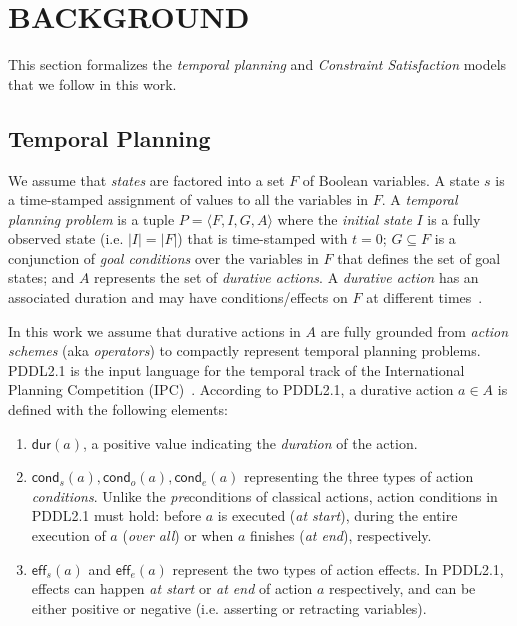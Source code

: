 \documentclass{ecai}
\newcommand{\tup}[1]{{\langle #1 \rangle}}
\newcommand{\eff}{\mathsf{eff}}    %
\newcommand{\cond}{\mathsf{cond}}  %
\newcommand{\dur}{\mathsf{dur}}    %
\begin{document}
\section{BACKGROUND}

This section formalizes the {\em temporal planning} and {\em Constraint Satisfaction} models that we follow in this work.

\subsection{Temporal Planning}
\label{sec:temporalplanning}

We assume that {\em states} are factored into a set $F$ of Boolean variables. A state $s$ is a time-stamped assignment of values to all the variables in $F$. A {\em temporal planning problem} is a tuple $P=\tup{F,I,G,A}$ where the {\em initial state} $I$ is a fully observed state (i.e. $|I|=|F|$) that is time-stamped with $t=0$; $G \subseteq F$ is a conjunction of {\em goal conditions} over the variables in $F$ that defines the set of goal states; and $A$ represents the set of {\em durative actions}. A {\em durative action} has an associated duration and may have conditions/effects on $F$ at different times~\cite{garrido2009constraint,vidal2006branching}.


In this work we assume that durative actions in $A$ are fully grounded from {\em action schemes} (aka {\em operators}) to compactly represent temporal planning problems.  PDDL2.1 is the input language for the temporal track of the International Planning Competition (IPC)~\cite{fox2003pddl2,ghallab2004automated}. According to PDDL2.1, a durative action $a\in A$ is defined with the following elements:

\begin{enumerate}
\item $\dur(a)$, a positive value indicating the {\em duration} of the action.

\item $\cond_s(a), \cond_o(a), \cond_e(a)$ representing the three types of action {\em conditions}. Unlike the \emph{pre}conditions of classical actions, action conditions in PDDL2.1 must hold: before $a$ is executed ({\em at start}), during the entire execution of $a$ ({\em over all}) or when $a$ finishes ({\em at end}), respectively. 

\item $\eff_s(a)$ and $\eff_e(a)$ represent the two types of action effects. In PDDL2.1, effects can happen {\em at start} or {\em at end} of action $a$ respectively, and can be either positive or negative (i.e. asserting or retracting variables). 

\end{enumerate}
\end{document}
